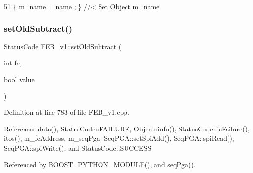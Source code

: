 \begin{DoxyCode}
51 \{ \hyperlink{classObject_a8b83c95c705d2c3ba0d081fe1710f48d}{m\_name}  = \hyperlink{classObject_a300f4c05dd468c7bb8b3c968868443c1}{name}  ; \} \textcolor{comment}{//< Set Object m\_name}
\end{DoxyCode}
\mbox{\label{classFEB__v1_aec8198d5c03ddc5dd9151683f9506d00}} 
\subsubsection{\texorpdfstring{set\+Old\+Subtract()}{setOldSubtract()}}
{\footnotesize\ttfamily \hyperlink{classStatusCode}{Status\+Code} F\+E\+B\+\_\+v1\+::set\+Old\+Subtract (\begin{DoxyParamCaption}\item[{int}]{fe,  }\item[{bool}]{value }\end{DoxyParamCaption})}



Definition at line 783 of file F\+E\+B\+\_\+v1.\+cpp.



References data(), Status\+Code\+::\+F\+A\+I\+L\+U\+RE, Object\+::info(), Status\+Code\+::is\+Failure(), itos(), m\+\_\+fe\+Address, m\+\_\+seq\+Pga, Seq\+P\+G\+A\+::set\+Spi\+Add(), Seq\+P\+G\+A\+::spi\+Read(), Seq\+P\+G\+A\+::spi\+Write(), and Status\+Code\+::\+S\+U\+C\+C\+E\+SS.



Referenced by B\+O\+O\+S\+T\+\_\+\+P\+Y\+T\+H\+O\+N\+\_\+\+M\+O\+D\+U\+L\+E(), and seq\+Pga().


